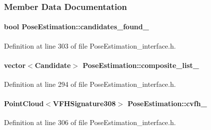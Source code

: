 \subsubsection{Member Data Documentation}
\hypertarget{classPoseEstimation_aa9c90e1b5d640638bdb2f48bd9b9df11}{
\paragraph[{candidates\-\_\-found\-\_\-}]{\setlength{\rightskip}{0pt plus 5cm}bool Pose\-Estimation\-::candidates\-\_\-found\-\_\-\hspace{0.3cm}{\ttfamily [private]}}}\label{classPoseEstimation_aa9c90e1b5d640638bdb2f48bd9b9df11}


Definition at line 303 of file Pose\-Estimation\-\_\-interface.\-h.

\hypertarget{classPoseEstimation_a72f85d5bdac0049b35cf932715505f1d}{
\paragraph[{composite\-\_\-list\-\_\-}]{\setlength{\rightskip}{0pt plus 5cm}vector$<${\bf Candidate}$>$ Pose\-Estimation\-::composite\-\_\-list\-\_\-\hspace{0.3cm}{\ttfamily [private]}}}\label{classPoseEstimation_a72f85d5bdac0049b35cf932715505f1d}


Definition at line 294 of file Pose\-Estimation\-\_\-interface.\-h.

\hypertarget{classPoseEstimation_a017646ee04a177539a060ab4bd2471f6}{
\paragraph[{cvfh\-\_\-}]{\setlength{\rightskip}{0pt plus 5cm}Point\-Cloud$<$V\-F\-H\-Signature308$>$ Pose\-Estimation\-::cvfh\-\_\-\hspace{0.3cm}{\ttfamily [private]}}}\label{classPoseEstimation_a017646ee04a177539a060ab4bd2471f6}


Definition at line 306 of file Pose\-Estimation\-\_\-interface.\-h.

